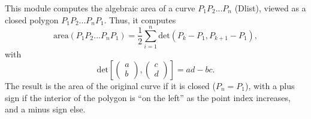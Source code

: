 This module computes the algebraic area 
of a curve $P_1P_2...P_n$
(Dlist), viewed as a closed polygon $P_1P_2...P_nP_1$. Thus, it computes
$$\mathrm{area} (P_1P_2...P_nP_1)= \frac 12 \sum_{i=1}^n \mathrm{det}
(P_k-P_1,P_{k+1}-P_1),$$
with
$$\mathrm{det}\left[\left(\begin{array}{l}a\\b\end{array}\right),\left(\begin{array}{l}c\\d\end{array}\right)\right] = ad-bc.$$
The result is the area of the original curve if it is closed 
($P_n=P_1$), with a plus sign if the interior of the polygon is ``on the
left'' as the point index increases, and a minus sign else.

